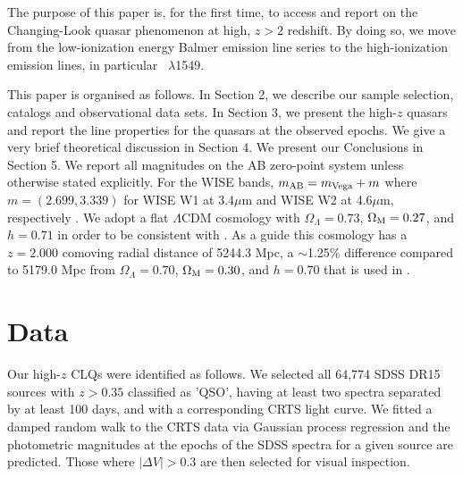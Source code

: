 \documentclass[a4paper,fleqn,usenatbib]{mnras}
\begin{document}
The purpose of this paper is, for the first time, to access and 
report on the Changing-Look quasar phenomenon at high, 
$z>2$ redshift. By doing so, we move from the low-ionization 
energy Balmer emission line series to the high-ionization emission 
lines, in particular \civ\ $\lambda$1549. 

This paper is organised as follows. In Section 2, we describe our
sample selection, catalogs and observational data sets.  In Section 3,
we present the high-$z$ quasars and report the line properties for the
quasars at the observed epochs.  We give a very brief theoretical
discussion in Section 4. We present our Conclusions in Section 5.  We
report all magnitudes on the AB zero-point system \citep{Oke_Gunn1983,
Fukugita1996} unless otherwise stated explicitly. For the WISE bands,
$m_{\rm AB} = m_{\rm Vega} + m$ where $m = (2.699, 3.339)$ for WISE W1
at 3.4$\mu$m and WISE W2 at 4.6$\mu$m, respectively
\citep{Cutri2011}.
We adopt a flat $\Lambda$CDM cosmology with $\Omega_{\Lambda} = 0.73$,
$\Omega_{\rm M} = 0.27$, and $h = 0.71$ in order to be consistent with
\citet{Hamann2017}. As a guide this cosmology has a $z=2.000$
comoving radial distance of 5244.3 Mpc, a $\sim$1.25\% difference
compared to 5179.0 Mpc from $\Omega_{\Lambda} = 0.70$, $\Omega_{\rm M}
= 0.30$, and $h = 0.70$ that is used in \citet{Shen2011}.



\section{Data}
Our high-$z$ CLQs were identified as follows. 
We selected all 64,774 SDSS DR15 sources with $z > 0.35$ classified as
'QSO', having at least two spectra separated by at least 100 days, and
with a corresponding CRTS light curve. We fitted a damped random walk
to the CRTS data via Gaussian process regression and the photometric
magnitudes at the epochs of the SDSS spectra for a given source are
predicted. Those where $|\Delta V| > 0.3$ are then selected for visual
inspection.
\end{document}
